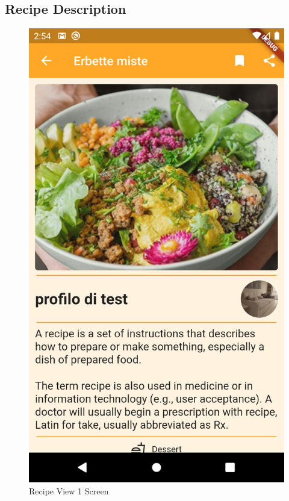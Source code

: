 \subsection{Recipe Description}
\begin{figure}
	\begin{minipage}{0.48\textwidth}
		\centering
		\includegraphics[width = .7\linewidth]{img/RecipeView.png}
		\caption{Recipe View 1 Screen}
	\end{minipage}\hfill
	\begin{minipage}{0.48\textwidth}
		\centering

\end{minipage}
\end{figure}
